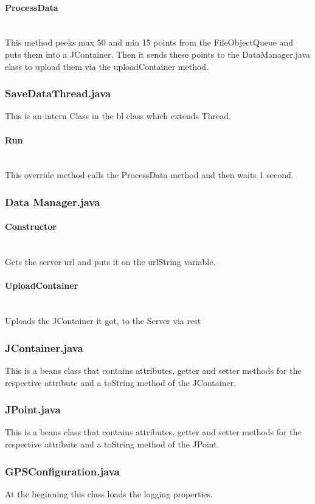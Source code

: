 \paragraph{ProcessData}\mbox{}\\
This method peeks max 50 and min 15 points from the FileObjectQueue and puts them into a JContainer. Then it sends these points to the DataManager.java class to upload them via the uploadContainer method.
\subsubsection{SaveDataThread.java}
This is an intern Class in the \gls{bl} class which extends Thread.
\paragraph{Run}\mbox{}\\
This override method calls the ProcessData method and then waits 1 second.
\subsubsection{Data Manager.java}
\paragraph{Constructor}\mbox{}\\
Gets the server \gls{url} and puts it on the urlString variable.
\paragraph{UploadContainer}\mbox{}\\
Uploads the JContainer it got, to the Server via \gls{rest} 
\subsubsection{JContainer.java}
This is a beans class that contains attributes, getter and setter methods for the respective attribute and a toString method of the JContainer.
\subsubsection{JPoint.java}
This is a beans class that contains attributes, getter and setter methods for the respective attribute and a toString method of the JPoint.
\subsubsection{GPSConfiguration.java}
At the beginning this class loads the logging properties.
